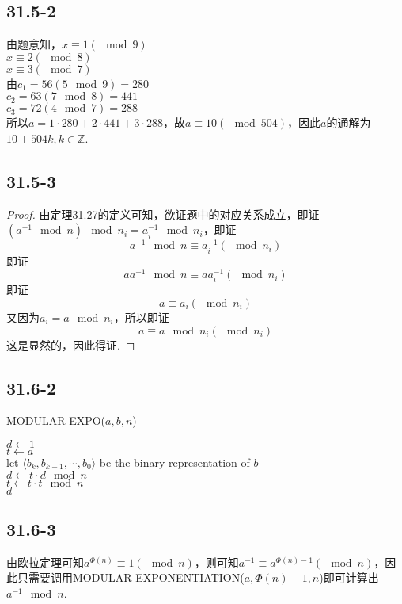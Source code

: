 \documentclass[twocolumn]{article}
\newenvironment{SChinese}{
	\CJKfamily{gbsn}
	\CJKtilde
	\CJKnospace}{}
\begin{document}
\begin{CJK}{UTF8}{}
\begin{SChinese}
			\subsection*{31.5-2}
				由题意知，$x\equiv1(\mod9)$ \\ $x\equiv2(\mod8)$ \\ $x\equiv3(\mod7)$\\由$c_1=56(5\mod9)=280$\\$c_2=63(7\mod8)=441$\\$c_3=72(4\mod7)=288$\\所以$a=1\cdot280+2\cdot441+3\cdot288$，故$a\equiv10(\mod504)$，因此$a$的通解为$10+504k,k\in\mathbb{Z}$.
			\subsection*{31.5-3}
				\begin{proof}
					由定理31.27的定义可知，欲证题中的对应关系成立，即证$(a^{-1}\mod n)\mod n_i=a_i^{-1}\mod n_i$，即证\[a^{-1}\mod n\equiv a_i^{-1}(\mod n_i)\]
					即证\[aa^{-1}\mod n\equiv aa_i^{-1}(\mod n_i)\]
					即证\[a\equiv a_i(\mod n_i)\]
					又因为$a_i=a\mod n_i$，所以即证\[a\equiv a\mod n_i(\mod n_i)\]
					这是显然的，因此得证.
				\end{proof}
			\subsection*{31.6-2}
				\begin{algorithm}
					\caption{MODULAR-EXPO($a,b,n$)}
					\begin{algorithmic}[1]
						\STATE $d\leftarrow1$ \\
						\STATE $t\leftarrow a$ \\
						\STATE let $\langle b_k,b_{k-1},\cdots,b_0\rangle$ be the binary representation of $b$ \\
						\STATE $d\leftarrow t\cdot d\mod n$ \\
						\ENDIF
						\STATE $t\leftarrow t\cdot t\mod n$\\
						\ENDFOR
						\RETURN $d$	
					\end{algorithmic}
				\end{algorithm}
			\subsection*{31.6-3}
				由欧拉定理可知$a^{\Phi(n)}\equiv1(\mod n)$，则可知$a^{-1}\equiv a^{\Phi(n)-1}(\mod n)$，因此只需要调用MODULAR-EXPONENTIATION($a,\Phi(n)-1,n$)即可计算出$a^{-1}\mod n$.
		\end{SChinese}
	\end{CJK}
\end{document}
